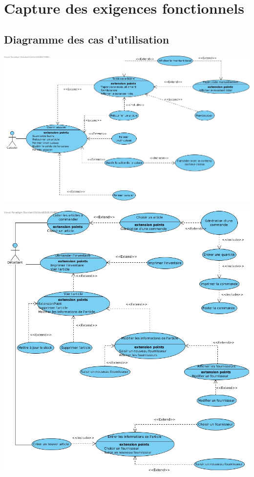 \chapter{Capture des exigences fonctionnels}

\section{Diagramme des cas d'utilisation}
\begin{center}
	\includegraphics[width=14cm]{Analyse/DiagrammeUseCaseCaisser.jpg}
\end{center}

\begin{center}
	\includegraphics[width=14cm]{Analyse/DiagrammeUseCaseDetaillant.jpg}
\end{center}

